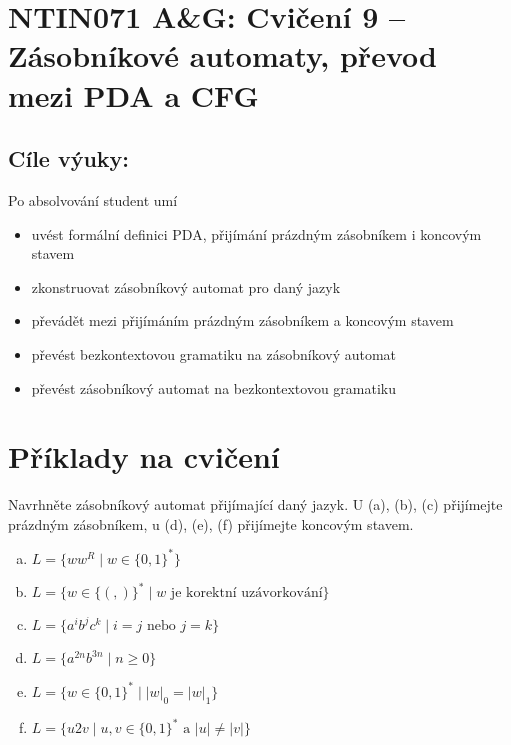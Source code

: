 \documentclass[a4paper,12pt]{amsart}
\begin{document}
\thispagestyle{empty}

\section*{NTIN071 A\&G: Cvičení 9 -- Zásobníkové automaty, převod mezi PDA a CFG}

\medskip

\subsection*{Cíle výuky:} Po absolvování student umí

\begin{itemize}\setlength{\itemsep}{0pt}
    \item uvést formální definici PDA, přijímání prázdným zásobníkem i koncovým stavem
    \item zkonstruovat zásobníkový automat pro daný jazyk
    \item převádět mezi přijímáním prázdným zásobníkem a koncovým stavem
    \item převést bezkontextovou gramatiku na zásobníkový automat
    \item převést zásobníkový automat na bezkontextovou gramatiku
\end{itemize}

\section*{Příklady na cvičení}

\medskip\begin{problem}\label{problem:construct-pda}

    Navrhněte zásobníkový automat přijímající daný jazyk. U (a), (b), (c) přijímejte prázdným zásobníkem, u (d), (e), (f) přijímejte koncovým stavem.

    \medskip

    \begin{enumerate}[(a)]\setlength\itemsep{6pt}
        \item $L=\{ww^R\mid w\in \{0,1\}^*\}$
        \item $L=\{w\in\{(,)\}^*\mid w\text{ je korektní uzávorkování}\}$
        \item $L=\{a^ib^jc^k\mid i=j \text{ nebo } j=k\} $
        \item $L=\{a^{2n}b^{3n}\mid n\geq 0\}$
        \item $L=\{w\in \{0,1\}^*\mid  |w|_0=|w|_1\} $
        \item $L=\{u2v\mid u,v\in \{0,1\}^*\text{ a }|u|\neq |v|\} $
    \end{enumerate}

\end{problem}
\end{document}

